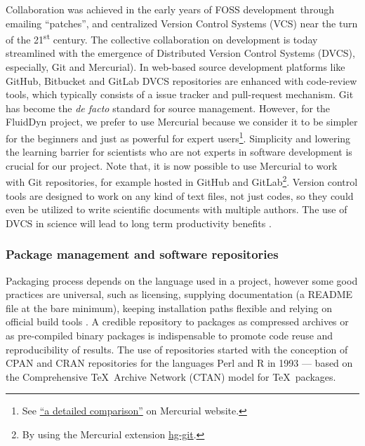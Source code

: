 Collaboration was achieved in the early years of FOSS development through
emailing ``patches'', and centralized Version Control Systems (VCS) near the
turn of the 21\textsuperscript{st} century.  The collective collaboration on
development is today streamlined with the emergence of Distributed Version
Control Systems (DVCS), especially, Git and Mercurial). In web-based source
development platforms like GitHub, Bitbucket and GitLab DVCS repositories are
enhanced with code-review tools, which typically consists of a issue tracker
and pull-request mechanism.
%
Git has become the \textit{de facto} standard for source management. However,
for the FluidDyn project, we prefer to use Mercurial because we consider it to
be simpler for the beginners and just as powerful for expert users\footnote{See
  \href{https://www.mercurial-scm.org/wiki/GitConcepts}{``a detailed
comparison''} on Mercurial website.}. Simplicity and lowering the learning
barrier for scientists who are not experts in software development is crucial
for our project.
%
Note that, it is now possible to use Mercurial to work with Git repositories,
for example hosted in GitHub and GitLab\footnote{By using the Mercurial
extension \href{http://hg-git.github.io/}{hg-git}.}.
%
Version control tools are designed to work on any kind of text files, not just
codes, so they could even be utilized to write scientific documents with
multiple authors.
%
The use of DVCS in science will lead to long term productivity benefits
\citep{wilson_best_2014}.


\subsubsection{Package management and software repositories} 

Packaging process depends on the language used in a project, however some good
practices are universal, such as licensing, supplying documentation (a README
file at the bare minimum), keeping installation paths flexible and relying on
official build tools \citep{taschuk_ten_2017}.
%
A credible repository to packages as compressed archives or as pre-compiled binary
packages is indispensable to promote code reuse and reproducibility of results.
%
The use of repositories started with the conception of
CPAN and CRAN repositories for the languages Perl and R in 1993 --- based on
the Comprehensive \TeX\ Archive Network (CTAN) model for \TeX\ packages. 

